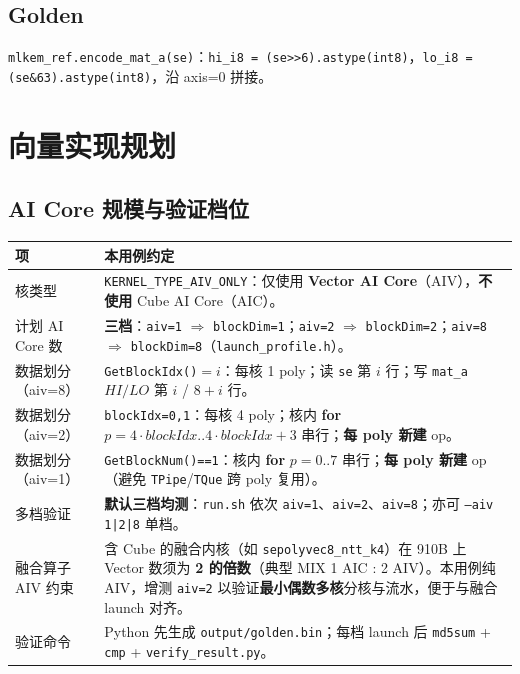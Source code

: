 \documentclass[UTF8,a4paper,11pt]{ctexart}
\begin{document}
\subsection{Golden}
\texttt{mlkem\_ref.encode\_mat\_a(se)}：\texttt{hi\_i8 = (se>>6).astype(int8)}，\texttt{lo\_i8 = (se\&63).astype(int8)}，沿 axis=0 拼接。

\section{向量实现规划}

\subsection{AI Core 规模与验证档位}
\label{sec:aicore}

\begin{longtable}{@{}L{2.8cm}L{10.5cm}@{}}
\toprule
项 & 本用例约定 \\
\midrule
核类型 & \texttt{KERNEL\_TYPE\_AIV\_ONLY}：仅使用 \textbf{Vector AI Core}（AIV），\textbf{不使用} Cube AI Core（AIC）。 \\
计划 AI Core 数 & \textbf{三档}：\texttt{aiv=1} $\Rightarrow$ \texttt{blockDim=1}；\texttt{aiv=2} $\Rightarrow$ \texttt{blockDim=2}；\texttt{aiv=8} $\Rightarrow$ \texttt{blockDim=8}（\texttt{launch\_profile.h}）。 \\
数据划分（aiv=8） & \texttt{GetBlockIdx()}$=i$：每核 1 poly；读 \texttt{se} 第 $i$ 行；写 \texttt{mat\_a} $HI/LO$ 第 $i$ / $8+i$ 行。 \\
数据划分（aiv=2） & \texttt{blockIdx=0,1}：每核 4 poly；核内 \textbf{for} $p=4\cdot blockIdx .. 4\cdot blockIdx+3$ 串行；\textbf{每 poly 新建} op。 \\
数据划分（aiv=1） & \texttt{GetBlockNum()==1}：核内 \textbf{for} $p=0..7$ 串行；\textbf{每 poly 新建} op（避免 \texttt{TPipe}/\texttt{TQue} 跨 poly 复用）。 \\
多档验证 & \textbf{默认三档均测}：\texttt{run.sh} 依次 \texttt{aiv=1}、\texttt{aiv=2}、\texttt{aiv=8}；亦可 \texttt{--aiv 1|2|8} 单档。 \\
融合算子 AIV 约束 & 含 Cube 的融合内核（如 \texttt{sepolyvec8\_ntt\_k4}）在 910B 上 Vector 数须为 \textbf{2 的倍数}（典型 MIX 1 AIC : 2 AIV）。本用例纯 AIV，增测 \texttt{aiv=2} 以验证\textbf{最小偶数多核}分核与流水，便于与融合 launch 对齐。 \\
验证命令 & Python 先生成 \texttt{output/golden.bin}；每档 launch 后 \texttt{md5sum} + \texttt{cmp} + \texttt{verify\_result.py}。 \\
\bottomrule
\end{longtable}
\end{document}
